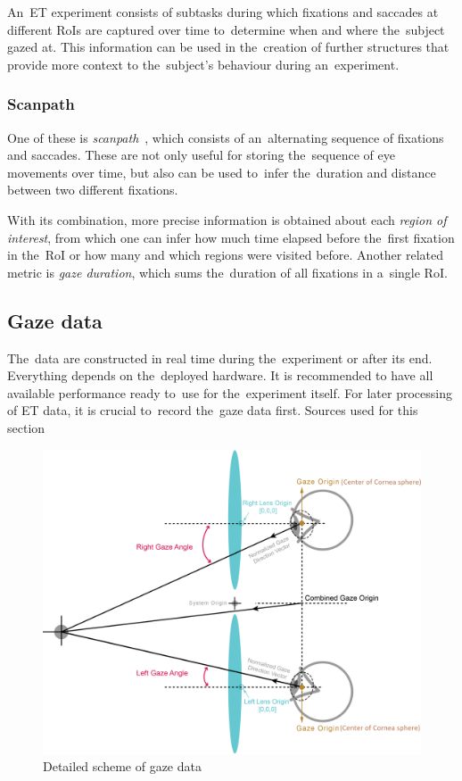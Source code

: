 An~ET experiment consists of subtasks during which fixations and saccades at different RoIs are captured over time to~determine when and where the~subject gazed at. This information can be used in the~creation of further structures that provide more context to the~subject's behaviour during an~experiment.~\cite{koenig2019}

\subsubsection*{Scanpath}
One of these is \emph{scanpath}~\cite{anuradha2017review}, which consists of an~alternating sequence of fixations and saccades. These are not only useful for storing the~sequence of eye movements over time, but also can be used to~infer the~duration and distance between two different fixations.

With its combination, more precise information is obtained about each \emph{region of interest}, from which one can infer how much time elapsed before the~first fixation in the~RoI or how many and which regions were visited before. Another related metric is \emph{gaze duration}, which sums the~duration of all fixations in a~single RoI.

\subsection{Gaze data}
\label{sec:gaze-data}
The~data are constructed in real time during the~experiment or after its end. Everything depends on the~deployed hardware. It is recommended to have all available performance ready to~use for the~experiment itself. For later processing of ET data, it is crucial to~record the~gaze data first. Sources used for this section~\cite{ugwitz2020thesis, koenig2019}

\begin{figure}[!ht]\centering
    \includegraphics[width=\textwidth]{img/EyeData.png}
    \caption[Detailed scheme of gaze data]{Detailed scheme of gaze data~\cite{sranipal-image}}
    \label{fig:gaze-data}
\end{figure}

